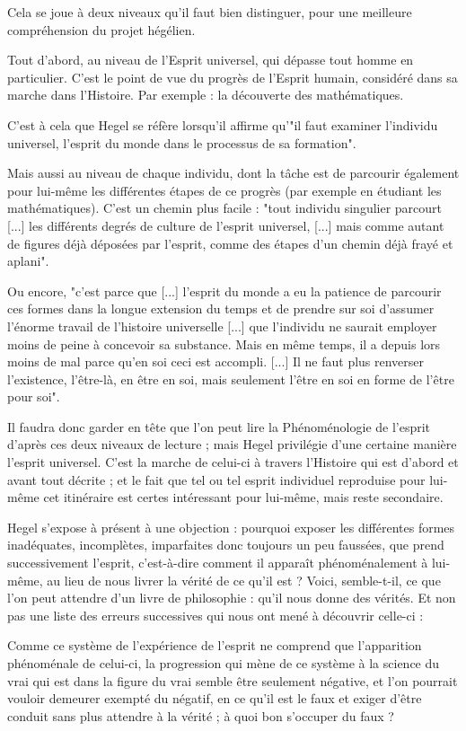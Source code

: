 Cela se joue à deux niveaux qu’il faut bien distinguer, pour une meilleure compréhension du projet hégélien.

Tout d’abord, au niveau de l’Esprit universel, qui dépasse tout homme en particulier. C’est le point de vue du progrès de l’Esprit humain, considéré dans sa marche dans l’Histoire. Par exemple : la découverte des mathématiques.

C’est à cela que Hegel se réfère lorsqu’il affirme qu’"il faut examiner l’individu universel, l’esprit du monde dans le processus de sa formation".

Mais aussi au niveau de chaque individu, dont la tâche est de parcourir également pour lui-même les différentes étapes de ce progrès (par exemple en étudiant les mathématiques). C’est un chemin plus facile : "tout individu singulier parcourt [...] les différents degrés de culture de l’esprit universel, [...] mais comme autant de figures déjà déposées par l’esprit, comme des étapes d’un chemin déjà frayé et aplani".

Ou encore, "c’est parce que [...] l’esprit du monde a eu la patience de parcourir ces formes dans la longue extension du temps et de prendre sur soi d’assumer l’énorme travail de l’histoire universelle [...] que l’individu ne saurait employer moins de peine à concevoir sa substance. Mais en même temps, il a depuis lors moins de mal parce qu’en soi ceci est accompli. [...] Il ne faut plus renverser l’existence, l’être-là, en être en soi, mais seulement l’être en soi en forme de l’être pour soi".

Il faudra donc garder en tête que l’on peut lire la Phénoménologie de l’esprit d’après ces deux niveaux de lecture ; mais Hegel privilégie d’une certaine manière l’esprit universel. C’est la marche de celui-ci à travers l’Histoire qui est d’abord et avant tout décrite ; et le fait que tel ou tel esprit individuel reproduise pour lui-même cet itinéraire est certes intéressant pour lui-même, mais reste secondaire.

Hegel s’expose à présent à une objection : pourquoi exposer les différentes formes inadéquates, incomplètes, imparfaites donc toujours un peu faussées, que prend successivement l’esprit, c’est-à-dire comment il apparaît phénoménalement à lui-même, au lieu de nous livrer la vérité de ce qu’il est ? Voici, semble-t-il, ce que l’on peut attendre d’un livre de philosophie : qu’il nous donne des vérités. Et non pas une liste des erreurs successives qui nous ont mené à découvrir celle-ci :

    Comme ce système de l’expérience de l’esprit ne comprend que l’apparition phénoménale de celui-ci, la progression qui mène de ce système à la science du vrai qui est dans la figure du vrai semble être seulement négative, et l’on pourrait vouloir demeurer exempté du négatif, en ce qu’il est le faux et exiger d’être conduit sans plus attendre à la vérité ; à quoi bon s’occuper du faux ?


